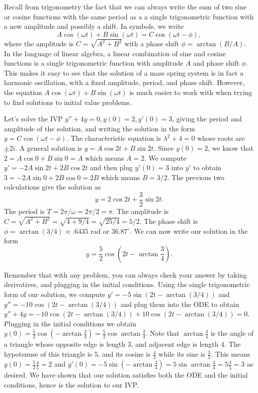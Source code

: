 Recall from trigonometry the fact that we can always write the sum of two sine or cosine functions with the same period as a a single trigonometric function with a new amplitude and possibly a shift.  
In symbols, we write $$A \cos(\omega t)+B\sin(\omega t) = C\cos(\omega t-\phi),$$ where the amplitude is $C=\sqrt{A^2+B^2}$ with a phase shift $\phi=\arctan(B/A)$.  
In the language of linear algebra, a linear combination of sine and cosine functions is a single trigonometric function with amplitude $A$ and phase shift $\phi$. 
This makes it easy to see that the solution of a mass spring system is in fact a harmonic oscillation, with a fixed amplitude, period, and phase shift. 
However, the equation $A \cos(\omega t)+B\sin(\omega t)$ is much easier to work with when trying to find solutions to initial value problems.

\begin{example}
Let's solve the IVP $y''+4y=0, y(0)=2,y'(0)=3$, giving the period and amplitude of the solution, and writing the solution in the form $y=C\cos(\omega t-\phi)$.  The characteristic equation is $\lambda^2+4=0$ whose roots are $\pm 2i$.  A general solution is $y=A\cos2t+B\sin2t$. Since $y(0)=2$, we know that $2=A\cos0+B\sin0 = A$ which means $A=2$. We compute $y'=-2A\sin 2t+2B\cos2t$ and then plug $y'(0)=3$ into $y'$ to obtain $3=-2A\sin0 +2B\cos0 =2B$ which means $B=3/2$. The previous two calculations give the solution as $$y=2\cos 2t +\frac 32 \sin 2t.$$       
The period is $T=2\pi/\omega = 2\pi/2=\pi$. 
The amplitude is $C=\sqrt{A^2+B^2} = \sqrt{4+9/4} = \sqrt{25/4} = 5/2$.  The phase shift is $\phi = \arctan(3/4) \approx .6435$ rad or $36.87^\circ$. We can now write our solution in the form 
$$y = \frac{5}{2}\cos\left(2t-\arctan \frac{3}{4}\right).$$

Remember that with any problem, you can always check your answer by taking derivatives, and plugging in the initial conditions.  Using the single trigonometric form of our solution, we compute $y'=-5\sin(2t-\arctan(3/4))$ and $y''=-10\cos(2t-\arctan(3/4))$ and plug them into the ODE to obtain $y''+4y = -10\cos(2t-\arctan(3/4)) + 10\cos(2t-\arctan(3/4)) = 0$. Plugging in the initial conditions we obtain $y(0) = \frac{5}{2}\cos\left(-\arctan \frac{3}{4}\right) = \frac 52\cos \arctan \frac 34$. Note that $\arctan\frac34$ is the angle of a triangle whose opposite edge is length 3, and adjacent edge is length 4.  The hypotenuse of this triangle is $5$, and its cosine is $\frac45$ while its sine is $\frac 35$. This means $y(0) = \frac52\frac45 = 2$ and $y'(0) = -5\sin(-\arctan\frac34) = 5\sin\arctan\frac34=5\frac35 = 3$ as desired. We have shown that our solution satisfies both the ODE and the initial conditions, hence is the solution to our IVP.   

\end{example}

